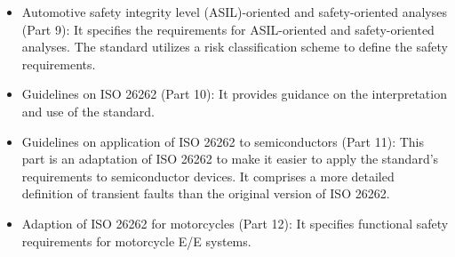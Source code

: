 \begin{itemize}
        \item  Automotive safety integrity level (ASIL)-oriented and safety-oriented analyses (Part 9): It specifies the requirements for ASIL-oriented and safety-oriented analyses. The standard utilizes a risk classification scheme to define the safety requirements.
        
        \item  Guidelines on ISO 26262 (Part 10): It provides guidance on the interpretation and use of the standard. %
        
        \item Guidelines on application of ISO 26262 to semiconductors (Part 11): This part is an adaptation of ISO 26262 to make it easier to apply the standard's requirements to semiconductor devices. It comprises a more detailed definition of transient faults than the original version of ISO 26262.
        
         \item Adaption of ISO 26262 for motorcycles (Part 12): It specifies functional safety requirements for motorcycle E/E systems.
    \end{itemize} 
    
    


